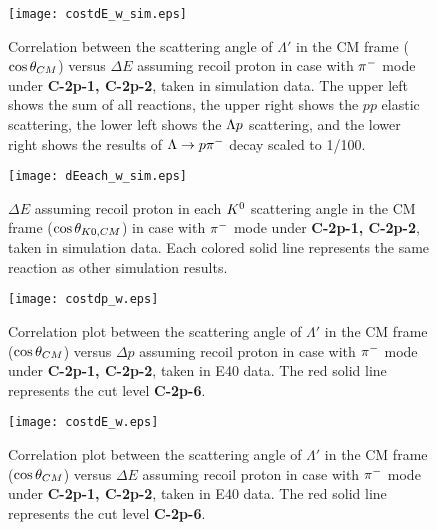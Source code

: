 \begin{figure}[!h]
  \begin{center}
    \texttt{[image: costdE\_w\_sim.eps]}
    \caption{Correlation between the scattering angle of $\Lambda'$ in the CM frame ($\cos{\theta}_{CM}$) versus $\Delta E$ assuming recoil proton in case  with $\pi^{-}$ mode under {\bf C-2p-1, C-2p-2}, taken in simulation data. The upper left shows the sum of all reactions, the upper right shows the $pp$ elastic scattering, the lower left shows the $\Lambda p$ scattering, and the lower right shows the results of $\Lambda\to p\pi^{-}$ decay scaled to 1/100.}
    \label{fig-costdE_w_sim}
  \end{center}
\end{figure}

\begin{figure}[!h]
  \begin{center}
    \texttt{[image: dEeach\_w\_sim.eps]}
    \caption{$\Delta E$ assuming recoil proton in each $K^{0}$ scattering angle in the CM frame ($\cos{\theta_{K0,CM}}$) in case  with $\pi^{-}$ mode under {\bf C-2p-1, C-2p-2}, taken in simulation data. Each colored solid line represents the same reaction as other simulation results.}
    \label{fig-dEeach_w_sim}
  \end{center}
\end{figure}


\begin{figure}[!h]
  \begin{center}
    \texttt{[image: costdp\_w.eps]}
    \caption{Correlation plot between the scattering angle of $\Lambda'$ in the CM frame ($\cos{\theta}_{CM}$) versus $\Delta p$ assuming recoil proton in case  with $\pi^{-}$ mode under {\bf C-2p-1, C-2p-2}, taken in E40 data. The red solid line represents the cut level {\bf C-2p-6}.}
    \label{fig-costdp_w}
  \end{center}
\end{figure}

\begin{figure}[!h]
  \begin{center}
    \texttt{[image: costdE\_w.eps]}
    \caption{Correlation plot between the scattering angle of $\Lambda'$ in the CM frame ($\cos{\theta}_{CM}$) versus $\Delta E$ assuming recoil proton in case  with $\pi^{-}$ mode under {\bf C-2p-1, C-2p-2}, taken in E40 data. The red solid line represents the cut level {\bf C-2p-6}.}
    \label{fig-costdE_w}
  \end{center}
\end{figure}

